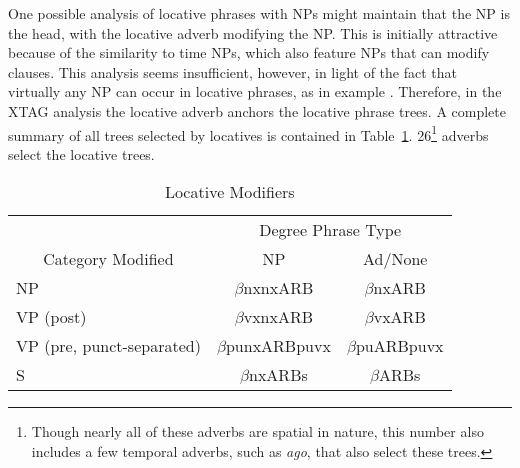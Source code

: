 One possible analysis of locative phrases with NPs might maintain that 
the NP is the head, with the locative adverb modifying the NP. This is 
initially attractive because of the similarity to time NPs, which also 
feature NPs that can modify clauses. This analysis seems insufficient, 
however, in light of the fact that virtually any NP can occur in 
locative phrases, as in example . Therefore, in the XTAG analysis 
the locative adverb anchors the locative phrase trees. A complete summary 
of all trees selected by locatives is contained in Table~\ref{loc-summary}. 
26\footnote{Though nearly all of these adverbs are spatial in nature, 
this number also includes a few temporal adverbs, such as {\it ago}, 
that also select these trees.} adverbs select the locative trees.


\begin{table}[htb]
\centering
\begin{tabular}{|l||c|c|}
\hline
\multicolumn{1}{|c||}{}&
\multicolumn{2}{|c|}{Degree Phrase Type}\\
\cline{2-3}
\multicolumn{1}{|c||}{Category Modified}&NP&Ad/None\\
\hline
\hline
NP&$\beta$nxnxARB&$\beta$nxARB\\
\hline
VP (post)&$\beta$vxnxARB&$\beta$vxARB\\
\hline
VP (pre, punct-separated)&$\beta$punxARBpuvx&$\beta$puARBpuvx\\
\hline
S&$\beta$nxARBs&$\beta$ARBs\\
\hline
\end{tabular}
\caption{Locative Modifiers}
\label{loc-summary}
\end{table}






